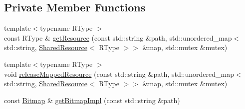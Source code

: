 \subsection*{Private Member Functions}
\begin{DoxyCompactItemize}
\item 
{\footnotesize template$<$typename R\+Type $>$ }\\const R\+Type \& \hyperlink{classZeta_1_1SynchronousResourceContext_a828e39ceb8bb1321c42237a151b214e0}{get\+Resource} (const std\+::string \&path, std\+::unordered\+\_\+map$<$ std\+::string, \hyperlink{classZeta_1_1SharedResource}{Shared\+Resource}$<$ R\+Type $>$$>$ \&map, std\+::mutex \&mutex)
\item 
{\footnotesize template$<$typename R\+Type $>$ }\\void \hyperlink{classZeta_1_1SynchronousResourceContext_aaf68cc9769f4092aa55bca5acf344a45}{release\+Mapped\+Resource} (const std\+::string \&path, std\+::unordered\+\_\+map$<$ std\+::string, \hyperlink{classZeta_1_1SharedResource}{Shared\+Resource}$<$ R\+Type $>$$>$ \&map, std\+::mutex \&mutex)
\item 
const \hyperlink{classZeta_1_1Bitmap}{Bitmap} \& \hyperlink{classZeta_1_1SynchronousResourceContext_ab65813b0a4c767d7c59f325b653fd591}{get\+Bitmap\+Impl} (const std\+::string \&path)
\end{DoxyCompactItemize}
